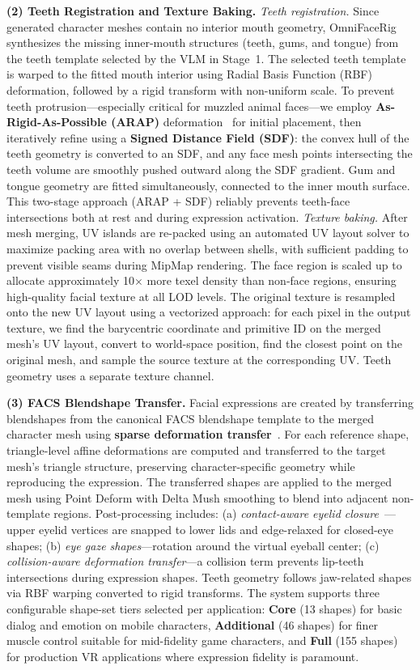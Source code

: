 \documentclass[acmtog,anonymous,review]{acmart}
\begin{document}
\textbf{(2) Teeth Registration and Texture Baking.} \emph{Teeth registration.} Since generated character meshes contain no interior mouth geometry, OmniFaceRig synthesizes the missing inner-mouth structures (teeth, gums, and tongue) from the teeth template selected by the VLM in Stage~1. The selected teeth template is warped to the fitted mouth interior using Radial Basis Function (RBF) deformation, followed by a rigid transform with non-uniform scale. To prevent teeth protrusion---especially critical for muzzled animal faces---we employ \textbf{As-Rigid-As-Possible (ARAP)} deformation~\cite{sorkine2007rigid} for initial placement, then iteratively refine using a \textbf{Signed Distance Field (SDF)}: the convex hull of the teeth geometry is converted to an SDF, and any face mesh points intersecting the teeth volume are smoothly pushed outward along the SDF gradient. Gum and tongue geometry are fitted simultaneously, connected to the inner mouth surface. This two-stage approach (ARAP + SDF) reliably prevents teeth-face intersections both at rest and during expression activation. \emph{Texture baking.} After mesh merging, UV islands are re-packed using an automated UV layout solver to maximize packing area with no overlap between shells, with sufficient padding to prevent visible seams during MipMap rendering. The face region is scaled up to allocate approximately 10$\times$ more texel density than non-face regions, ensuring high-quality facial texture at all LOD levels. The original texture is resampled onto the new UV layout using a vectorized approach: for each pixel in the output texture, we find the barycentric coordinate and primitive ID on the merged mesh's UV layout, convert to world-space position, find the closest point on the original mesh, and sample the source texture at the corresponding UV. Teeth geometry uses a separate texture channel.

\textbf{(3) FACS Blendshape Transfer.} Facial expressions are created by transferring blendshapes from the canonical FACS blendshape template to the merged character mesh using \textbf{sparse deformation transfer}~\cite{sumner2004deformation}. For each reference shape, triangle-level affine deformations are computed and transferred to the target mesh's triangle structure, preserving character-specific geometry while reproducing the expression. The transferred shapes are applied to the merged mesh using Point Deform with Delta Mush smoothing to blend into adjacent non-template regions. Post-processing includes: (a) \emph{contact-aware eyelid closure}~\cite{lewis2014practice}---upper eyelid vertices are snapped to lower lids and edge-relaxed for closed-eye shapes; (b) \emph{eye gaze shapes}---rotation around the virtual eyeball center; (c) \emph{collision-aware deformation transfer}---a collision term prevents lip-teeth intersections during expression shapes. Teeth geometry follows jaw-related shapes via RBF warping converted to rigid transforms. The system supports three configurable shape-set tiers selected per application: \textbf{Core} (13 shapes) for basic dialog and emotion on mobile characters, \textbf{Additional} (46 shapes) for finer muscle control suitable for mid-fidelity game characters, and \textbf{Full} (155 shapes) for production VR applications where expression fidelity is paramount.
\end{document}
